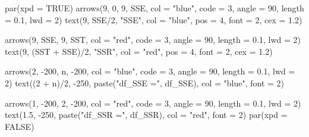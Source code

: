 \documentclass[
  letterpaper,
]{scrbook}
\newenvironment{Shaded}{\begin{snugshade}}{\end{snugshade}}
\newcommand{\AttributeTok}[1]{\textcolor[rgb]{0.40,0.45,0.13}{#1}}
\newcommand{\ConstantTok}[1]{\textcolor[rgb]{0.56,0.35,0.01}{#1}}
\newcommand{\DecValTok}[1]{\textcolor[rgb]{0.68,0.00,0.00}{#1}}
\newcommand{\FloatTok}[1]{\textcolor[rgb]{0.68,0.00,0.00}{#1}}
\newcommand{\FunctionTok}[1]{\textcolor[rgb]{0.28,0.35,0.67}{#1}}
\newcommand{\NormalTok}[1]{\textcolor[rgb]{0.00,0.23,0.31}{#1}}
\newcommand{\SpecialCharTok}[1]{\textcolor[rgb]{0.37,0.37,0.37}{#1}}
\newcommand{\StringTok}[1]{\textcolor[rgb]{0.13,0.47,0.30}{#1}}
\begin{document}
\begin{Shaded}
\begin{Highlighting}[]
\FunctionTok{par}\NormalTok{(}\AttributeTok{xpd =} \ConstantTok{TRUE}\NormalTok{)}
\FunctionTok{arrows}\NormalTok{(}\DecValTok{9}\NormalTok{, }\DecValTok{0}\NormalTok{, }\DecValTok{9}\NormalTok{, SSE, }\AttributeTok{col =} \StringTok{"blue"}\NormalTok{, }\AttributeTok{code =} \DecValTok{3}\NormalTok{, }\AttributeTok{angle =} \DecValTok{90}\NormalTok{, }\AttributeTok{length =} \FloatTok{0.1}\NormalTok{, }\AttributeTok{lwd =} \DecValTok{2}\NormalTok{)}
\FunctionTok{text}\NormalTok{(}\DecValTok{9}\NormalTok{, SSE}\SpecialCharTok{/}\DecValTok{2}\NormalTok{, }\StringTok{"SSE"}\NormalTok{, }\AttributeTok{col =} \StringTok{"blue"}\NormalTok{, }\AttributeTok{pos =} \DecValTok{4}\NormalTok{, }\AttributeTok{font =} \DecValTok{2}\NormalTok{, }\AttributeTok{cex =} \FloatTok{1.2}\NormalTok{)}

\FunctionTok{arrows}\NormalTok{(}\DecValTok{9}\NormalTok{, SSE, }\DecValTok{9}\NormalTok{, SST, }\AttributeTok{col =} \StringTok{"red"}\NormalTok{, }\AttributeTok{code =} \DecValTok{3}\NormalTok{, }\AttributeTok{angle =} \DecValTok{90}\NormalTok{, }\AttributeTok{length =} \FloatTok{0.1}\NormalTok{, }\AttributeTok{lwd =} \DecValTok{2}\NormalTok{)}
\FunctionTok{text}\NormalTok{(}\DecValTok{9}\NormalTok{, (SST }\SpecialCharTok{+}\NormalTok{ SSE)}\SpecialCharTok{/}\DecValTok{2}\NormalTok{, }\StringTok{"SSR"}\NormalTok{, }\AttributeTok{col =} \StringTok{"red"}\NormalTok{, }\AttributeTok{pos =} \DecValTok{4}\NormalTok{, }\AttributeTok{font =} \DecValTok{2}\NormalTok{, }\AttributeTok{cex =} \FloatTok{1.2}\NormalTok{)}

\FunctionTok{arrows}\NormalTok{(}\DecValTok{2}\NormalTok{, }\SpecialCharTok{{-}}\DecValTok{200}\NormalTok{, n, }\SpecialCharTok{{-}}\DecValTok{200}\NormalTok{, }\AttributeTok{col =} \StringTok{"blue"}\NormalTok{, }\AttributeTok{code =} \DecValTok{3}\NormalTok{, }\AttributeTok{angle =} \DecValTok{90}\NormalTok{, }\AttributeTok{length =} \FloatTok{0.1}\NormalTok{, }\AttributeTok{lwd =} \DecValTok{2}\NormalTok{)}
\FunctionTok{text}\NormalTok{((}\DecValTok{2} \SpecialCharTok{+}\NormalTok{ n)}\SpecialCharTok{/}\DecValTok{2}\NormalTok{, }\SpecialCharTok{{-}}\DecValTok{250}\NormalTok{, }\FunctionTok{paste}\NormalTok{(}\StringTok{"df\_SSE ="}\NormalTok{, df\_SSE), }\AttributeTok{col =} \StringTok{"blue"}\NormalTok{, }\AttributeTok{font =} \DecValTok{2}\NormalTok{)}

\FunctionTok{arrows}\NormalTok{(}\DecValTok{1}\NormalTok{, }\SpecialCharTok{{-}}\DecValTok{200}\NormalTok{, }\DecValTok{2}\NormalTok{, }\SpecialCharTok{{-}}\DecValTok{200}\NormalTok{, }\AttributeTok{col =} \StringTok{"red"}\NormalTok{, }\AttributeTok{code =} \DecValTok{3}\NormalTok{, }\AttributeTok{angle =} \DecValTok{90}\NormalTok{, }\AttributeTok{length =} \FloatTok{0.1}\NormalTok{, }\AttributeTok{lwd =} \DecValTok{2}\NormalTok{)}
\FunctionTok{text}\NormalTok{(}\FloatTok{1.5}\NormalTok{, }\SpecialCharTok{{-}}\DecValTok{250}\NormalTok{, }\FunctionTok{paste}\NormalTok{(}\StringTok{"df\_SSR ="}\NormalTok{, df\_SSR), }\AttributeTok{col =} \StringTok{"red"}\NormalTok{, }\AttributeTok{font =} \DecValTok{2}\NormalTok{)}
\FunctionTok{par}\NormalTok{(}\AttributeTok{xpd =} \ConstantTok{FALSE}\NormalTok{)}


\end{Highlighting}
\end{Shaded}
\end{document}
